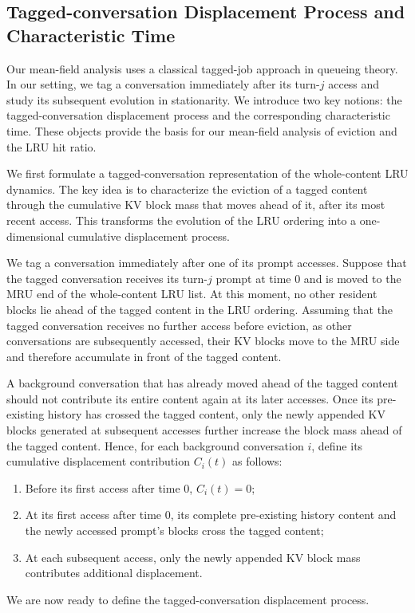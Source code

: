 \documentclass{article}
\theoremstyle{definition}
\begin{document}
\subsection{Tagged-conversation Displacement Process and Characteristic Time}
\label{ssec: tagged-conversation Displacement Process and Characteristic Time}

Our mean-field analysis uses a classical tagged-job approach in queueing theory. In our setting, we tag a conversation immediately after its turn-$j$ access and study its subsequent evolution in stationarity. We introduce two key notions: the tagged-conversation displacement process and the corresponding characteristic time. These objects provide the basis for our mean-field analysis of eviction and the LRU hit ratio.

We first formulate a tagged-conversation representation of the whole-content LRU dynamics. The key idea is to characterize the eviction of a tagged content through the cumulative KV block mass that moves ahead of it, after its most recent access. This transforms the evolution of the LRU ordering into a one-dimensional cumulative displacement process.

We tag a conversation immediately after one of its prompt accesses. Suppose that the tagged conversation receives its turn-$j$ prompt at time $0$ and is moved to the MRU end of the whole-content LRU list. At this moment, no other resident blocks lie ahead of the tagged content in the LRU ordering. Assuming that the tagged conversation receives no further access before eviction, as other conversations are subsequently accessed, their KV blocks move to the MRU side and therefore accumulate in front of the tagged content.

A background conversation that has already moved ahead of the tagged content should not contribute its entire content again at its later accesses. Once its pre-existing history has crossed the tagged content, only the newly appended KV blocks generated at subsequent accesses further increase the block mass ahead of the tagged content. Hence, for each background conversation $i$, define its cumulative displacement contribution $C_i(t)$ as follows:
\begin{enumerate}
    \item Before its first access after time $0$, $C_i(t)=0$;
    \item At its first access after time $0$, its complete pre-existing history content and the newly accessed prompt's blocks cross the tagged content;
    \item At each subsequent access, only the newly appended KV block mass contributes additional displacement.
\end{enumerate}
We are now ready to define the tagged-conversation displacement process.
\end{document}
